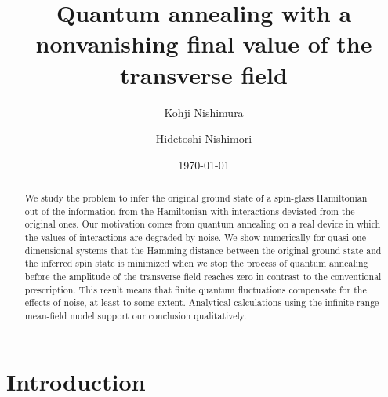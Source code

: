 \documentclass[aps,pra,twocolumn,groupedaddress,longbibliography]{revtex4}
\begin{document}
\title{Quantum annealing with a nonvanishing final value of the transverse field}

\author{Kohji Nishimura}

\author{Hidetoshi Nishimori}

\date{\today}

\begin{abstract}
	We study the problem to infer the original ground state of a spin-glass Hamiltonian out of the information from the Hamiltonian with interactions deviated from the original ones. Our motivation comes from quantum annealing on a real device in which the values of interactions are degraded by noise. We show numerically for quasi-one-dimensional systems that the Hamming distance between the original ground state and the inferred spin state is minimized when we stop the process of quantum annealing before the amplitude of the transverse field reaches zero in contrast to the conventional prescription.  This result means that finite quantum fluctuations compensate for the effects of noise, at least to some extent. Analytical calculations using the infinite-range mean-field model support our conclusion qualitatively.
\end{abstract}


\maketitle

\section{Introduction}
\end{document}
